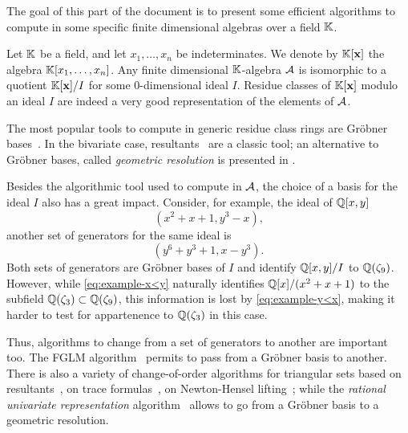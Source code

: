 The goal of this part of the document is to present some efficient
algorithms to compute in some specific finite dimensional algebras
over a field $\mathbb{K}$.

Let $\mathbb{K}$ be a field, and let $x_1,\ldots,x_n$ be indeterminates. We
denote by $\mathbb{K}[\mathbf{x}]$ the algebra $\mathbb{K}[x_1,\ldots,x_n]$. Any finite
dimensional $\mathbb{K}$-algebra $\mathcal{A}$ is isomorphic to a quotient
$\mathbb{K}[\mathbf{x}]/I$ for some $0$-dimensional ideal $I$. Residue classes of
$\mathbb{K}[\mathbf{x}]$ modulo an ideal $I$ are indeed a very good
representation of the elements of $\mathcal{A}$.

The most popular tools to compute in generic residue class rings are
Gröbner
bases~\cite{buchberger,cox+little+oshea,Cox-Little-OShea:UAG2005,faugere99,faugere02}. In
the bivariate case,
resultants~\cite{cox+little+oshea,Cox-Little-OShea:UAG2005} are a
classic tool; an alternative to Gröbner bases, called \emph{geometric
  resolution} is presented in \cite{giusti+lecerf+salvy01}.

Besides the algorithmic tool used to compute in $\mathcal{A}$, the
choice of a basis for the ideal $I$ also has a great impact. Consider,
for example, the ideal of $\mathbb{Q}[x,y]$
\begin{equation}
  \label{eq:example-x<y}
  (x^2 + x + 1, y^3 - x)
  \text{,}
\end{equation}
another set of generators for the same ideal is
\begin{equation}
  \label{eq:example-y<x}
  (y^6 + y^3 + 1, x - y^3)
  \text{.}
\end{equation}
Both sets of generators are Gröbner bases of $I$ and identify
$\mathbb{Q}[x,y]/I$ to $\mathbb{Q}(\zeta_9)$. However, while \eqref{eq:example-x<y}
naturally identifies $\mathbb{Q}[x]/(x^2+x+1)$ to the subfield
$\mathbb{Q}(\zeta_3)\subset\mathbb{Q}(\zeta_9)$, this information is lost by
\eqref{eq:example-y<x}, making it harder to test for appartenence to
$\mathbb{Q}(\zeta_3)$ in this case.

Thus, algorithms to change from a set of generators to another are
important too. The FGLM algorithm~\cite{FGLM} permits to pass from a
Gröbner basis to another. There is also a variety of change-of-order
algorithms for triangular sets based on
resultants~\cite{boulier+lemaire+moreno01}, on trace
formulas~\cite{diaz+gonzalez01,pascal+schost06}, on Newton-Hensel
lifting~\cite{dahan+jin+moreno+schost08}; while the \emph{rational
  univariate representation} algorithm~\cite{rouiller99} allows to go
from a Gröbner basis to a geometric resolution.

